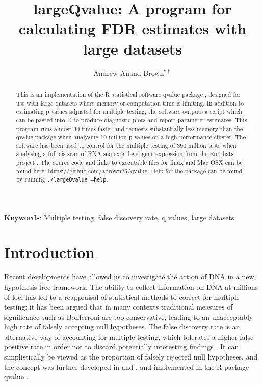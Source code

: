 \documentclass{amsart}
\author[]{Andrew Anand Brown$^{*\dagger}$}
\title[largeQvalue]{largeQvalue: A program for calculating FDR estimates with large datasets}
\begin{document}
\maketitle

\linespread{1.6}

\begin{abstract}
This is an implementation of the R statistical software qvalue package \citep{qvalue}, designed for use with large datasets where memory or computation time is limiting. In addition to estimating p values adjusted for multiple testing, the software outputs a script which can be pasted into R to produce diagnostic plots and report parameter estimates. This program runs almost 30 times faster and requests substantially less memory than the qvalue package when analysing 10 million p values on a high performance cluster. The software has been used to control for the multiple testing of 390 million tests when analysing a full cis scan of RNA-seq exon level gene expression from the Eurobats project \citep{brownepistasis}. The source code and links to executable files for linux and Mac OSX can be found here: \url{https://github.com/abrown25/qvalue}. Help for the package can be found by running \texttt{./largeQvalue --help}.
\end{abstract}

\bigskip

\noindent \small{\textbf{Keywords}: Multiple testing, false discovery rate, q values, large datasets}

\bigskip

\section{Introduction}

Recent developments have allowed us to investigate the action of DNA in a new, hypothesis free framework. The ability to collect information on DNA at millions of loci has led to a reappraisal of statistical methods to correct for multiple testing: it has been argued that in many contexts traditional measures of significance such as Bonferroni are too conservative, leading to an unacceptably high rate of falsely accepting null hypotheses. The false discovery rate is an alternative way of accounting for multiple testing, which tolerates a higher false positive rate in order not to discard potentially interesting findings \citep{fdr}. It can simplistically be viewed as the proportion of falsely rejected null hypotheses, and the concept was further developed in \citet{splinestorey} and \citet{bootstorey}, and implemented in the R package qvalue \citep{qvalue}.
\end{document}
